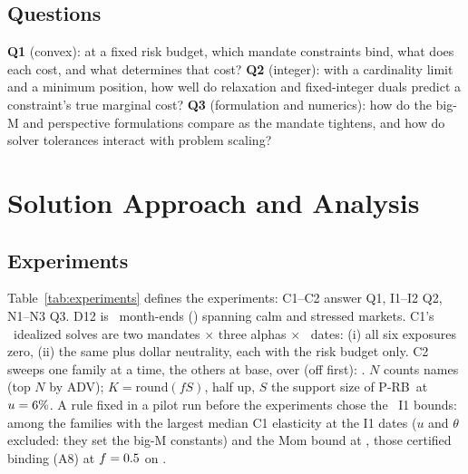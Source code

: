 \documentclass[conference]{IEEEtran}
\newcommand{\pmi}{\mbox{P-MI}}
\newcommand{\prb}{\mbox{P-RB}}
\begin{document}
\subsection{Questions}
\label{sec:questions}
\textbf{Q1} (convex): at a fixed risk budget, which mandate constraints bind, what does each cost, and what determines that cost? \textbf{Q2} (integer): with a cardinality limit and a minimum position, how well do relaxation and fixed-integer duals predict a constraint's true marginal cost? \textbf{Q3} (formulation and numerics): how do the big-M and perspective formulations compare as the mandate tightens, and how do solver tolerances interact with problem scaling?

\begin{table}[!t]
\caption{Base mandate (\prb) and \pmi\ parameters; style bounds in loading units.}
\label{tab:mandate}
\centering

\end{table}

\section{Solution Approach and Analysis}
\label{sec:approach}

\subsection{Experiments}
Table~\ref{tab:experiments} defines the experiments: C1--C2 answer Q1, I1--I2 Q2, N1--N3 Q3. D12 is \NDTwelve\ month-ends (\DTwelve) spanning calm and stressed markets. C1's \IdealN\ idealized solves are two mandates $\times$ three alphas $\times$ \NDTwelve\ dates: (i) all six exposures zero, (ii) the same plus dollar neutrality, each with the risk budget only. C2 sweeps one family at a time, the others at base, over (off first): \CTwoGrids. $N$ counts names (top $N$ by ADV); $K=\mathrm{round}(fS)$, half up, $S$ the support size of \prb\ at $u=6\%$. A rule fixed in a pilot run before the experiments chose the \IOneNCons\ I1 bounds: among the families with the largest median C1 elasticity at the I1 dates ($u$ and $\theta$ excluded: they set the big-M constants) and the Mom bound at \MomBound, those certified binding (A8) at $f=0.5$ on \DIb.

\begin{table}[!t]
\caption{Experiments; solves: the optimization solves in each run.}
\label{tab:experiments}
\centering

\end{table}
\end{document}
